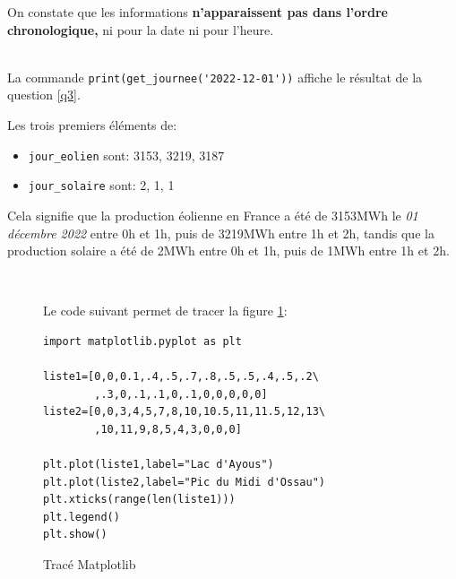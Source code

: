 On constate que les informations \textbf{n’apparaissent pas dans l'ordre chronologique,} ni pour la date ni pour l'heure.


~\ \\

La commande \verb?print(get_journee('2022-12-01'))? affiche le résultat de la question \ref{q3}.


\newpage

Les trois premiers éléments de:
\begin{itemize}
 \item \texttt{jour\_eolien} sont: 3153, 3219, 3187
 \item \texttt{jour\_solaire} sont: 2, 1, 1
\end{itemize}

Cela signifie que la production éolienne en France a été de 3153MWh le \textit{01 décembre 2022} entre 0h et 1h, puis de 3219MWh  entre 1h et 2h, tandis que la production solaire a été de 2MWh entre 0h et 1h, puis de 1MWh  entre 1h et 2h.

~\

\begin{figure}[ht!]
\begin{minipage}{0.5\linewidth}
Le code suivant permet de tracer la figure \ref{fig:img3}:
\begin{verbatim}
import matplotlib.pyplot as plt

liste1=[0,0,0.1,.4,.5,.7,.8,.5,.5,.4,.5,.2\
		,.3,0,.1,.1,0,.1,0,0,0,0,0]
liste2=[0,0,3,4,5,7,8,10,10.5,11,11.5,12,13\
		,10,11,9,8,5,4,3,0,0,0]

plt.plot(liste1,label="Lac d'Ayous")
plt.plot(liste2,label="Pic du Midi d'Ossau")
plt.xticks(range(len(liste1)))
plt.legend()
plt.show()
\end{verbatim}
\end{minipage}\hfill
\begin{minipage}{0.45\linewidth}
\centering\resizebox{0.9\textwidth}{!}{}
\caption{\label{fig:img3} Tracé Matplotlib}
\end{minipage}
\end{figure}

